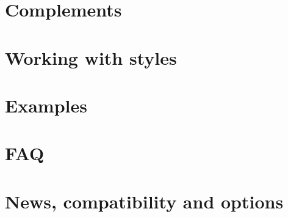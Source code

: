 \documentclass[DIV         = 14,
               fontsize    = 10,
               index       = totoc,
               twoside,
               cadre,
               headings    = small,
               ]{tkz-doc}
\begin{document}
\part{Complements}





\part{Working with styles}


\part{Examples}



\part{FAQ}


\part{News, compatibility and options}



\clearpage\newpage
\small\printindex
\end{document}
